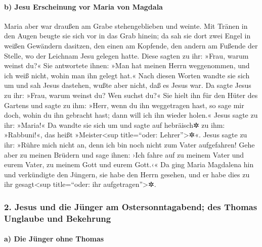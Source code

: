 \hypertarget{b-jesu-erscheinung-vor-maria-von-magdala}{%
\paragraph{b) Jesu Erscheinung vor Maria von
Magdala}\label{b-jesu-erscheinung-vor-maria-von-magdala}}

 Maria aber war draußen am Grabe stehengeblieben und
weinte. Mit Tränen in den Augen beugte sie sich vor in das Grab hinein;
 da sah sie dort zwei Engel in weißen Gewändern dasitzen,
den einen am Kopfende, den andern am Fußende der Stelle, wo der Leichnam
Jesu gelegen hatte.  Diese sagten zu ihr: »Frau, warum
weinst du?« Sie antwortete ihnen: »Man hat meinen Herrn weggenommen, und
ich weiß nicht, wohin man ihn gelegt hat.«  Nach diesen
Worten wandte sie sich um und sah Jesus dastehen, wußte aber nicht, daß
es Jesus war.  Da sagte Jesus zu ihr: »Frau, warum weinst
du? Wen suchst du?« Sie hielt ihn für den Hüter des Gartens und sagte zu
ihm: »Herr, wenn du ihn weggetragen hast, so sage mir doch, wohin du ihn
gebracht hast; dann will ich ihn wieder holen.«  Jesus
sagte zu ihr: »Maria!« Da wandte sie sich um und sagte auf hebräisch✲ zu
ihm: »Rabbuni!«, das heißt »Meister\textless sup title=``oder:
Lehrer''\textgreater✲«.  Jesus sagte zu ihr: »Rühre mich
nicht an, denn ich bin noch nicht zum Vater aufgefahren! Gehe aber zu
meinen Brüdern und sage ihnen: ›Ich fahre auf zu meinem Vater und eurem
Vater, zu meinem Gott und eurem Gott.‹«  Da ging Maria
Magdalena hin und verkündigte den Jüngern, sie habe den Herrn gesehen,
und er habe dies zu ihr gesagt\textless sup title=``oder: ihr
aufgetragen''\textgreater✲.

\hypertarget{jesus-und-die-juxfcnger-am-ostersonntagabend-des-thomas-unglaube-und-bekehrung}{%
\subsubsection{2. Jesus und die Jünger am Ostersonntagabend; des Thomas
Unglaube und
Bekehrung}\label{jesus-und-die-juxfcnger-am-ostersonntagabend-des-thomas-unglaube-und-bekehrung}}

\hypertarget{a-die-juxfcnger-ohne-thomas}{%
\paragraph{a) Die Jünger ohne
Thomas}\label{a-die-juxfcnger-ohne-thomas}}

